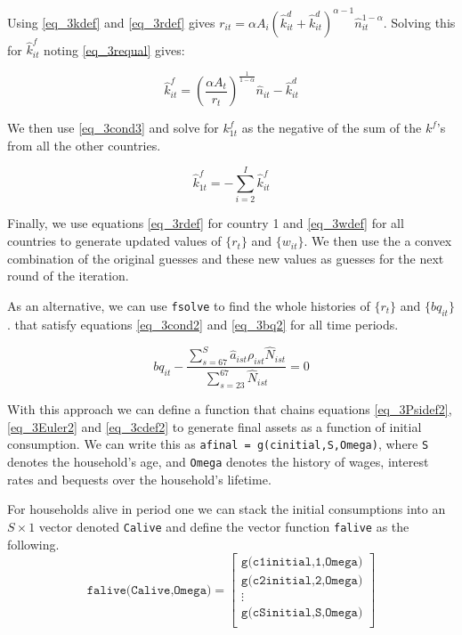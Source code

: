 \documentclass[letterpaper,12pt]{article}
\theoremstyle{definition}
\numberwithin{equation}{section}
\begin{document}
\begin{spacing}{1.5}
	Using \eqref{eq_3kdef} and \eqref{eq_3rdef} gives $r_{it} = \alpha A_i(\hat k^d_{it} + \hat k^d_{it})^{\alpha-1} \hat n_{it}^{1-\alpha}$.  Solving this for $\hat k^f_{it}$ noting \eqref{eq_3requal} gives:

	\begin{equation}
        \hat k^f_{it} = \left(\frac{\alpha A_t}{r_t}\right)^{\frac{1}{1-\alpha}} \hat n_{it} - \hat k^d_{it}
	\end{equation}

	We then use \eqref{eq_3cond3} and solve for $k^f_{1t}$ as the negative of the sum of the $k^f$'s from all the other countries.

	\begin{equation}
		\hat k^f_{1t} = -\sum_{i=2}^I \hat k^f_{it}
	\end{equation}

	Finally, we use equations \eqref{eq_3rdef} for country 1 and \eqref{eq_3wdef} for all countries to generate updated values of $\{r_t\}$ and $\{w_{it}\}$.  We then use the a convex combination of the original guesses and these new values as guesses for the next round of the iteration.

	As an alternative, we can use \texttt{fsolve} to find the whole histories of $\{r_t\}$ and $\{bq_{it}\}$. that satisfy equations \eqref{eq_3cond2} and \eqref{eq_3bq2} for all time periods.

	\begin{equation}
		bq_{it} - \frac{\sum_{s=67}^S \hat a_{ist} \rho_{ist} \hat N_{ist}} {\sum_{s=23}^{67} \hat N_{ist}} = 0 \label{eq_3bq2}
	\end{equation}

	With this approach we can define a function that chains equations \eqref{eq_3Psidef2}, \eqref{eq_3Euler2} and \eqref{eq_3cdef2} to generate final assets as a function of initial consumption.  We can write this as \texttt{afinal = g(cinitial,S,Omega)}, where \texttt{S} denotes the household's age, and \texttt{Omega} denotes the history of wages, interest rates and bequests over the household's lifetime.

	For households alive in period one we can stack the initial consumptions into an $S\times 1$ vector denoted \texttt{Calive} and define the vector function \texttt{falive} as the following.
	\begin{equation}
		\texttt{falive(Calive,Omega)} = 
		\begin{bmatrix}
		\texttt{g(c1initial,1,Omega)} \\
		\texttt{g(c2initial,2,Omega)} \\
		\vdots \\
		\texttt{g(cSinitial,S,Omega)} \\
		\end{bmatrix} \nonumber
	\end{equation}


\end{spacing}
\end{document}
